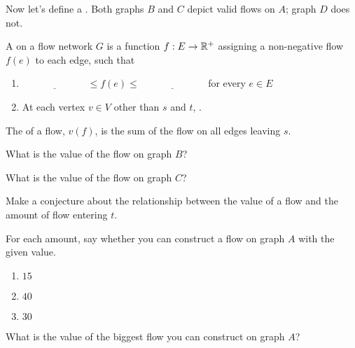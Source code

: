 \documentclass{tufte-handout}
\begin{document}
Now let's define a .  Both graphs $B$ and $C$ depict valid
flows on $A$; graph $D$ does not.

\begin{defn}
  A  on a flow network $G$ is a function $f : E \to \mathbb{R}^+$
  assigning a non-negative flow $f(e)$ to each edge, such that
  \begin{enumerate}
  \item $\underline{\phantom{XXXXXXXX}} \leq f(e) \leq
    \underline{\phantom{XXXXXXXX}}$ for every $e \in E$
  \item At each vertex $v \in V$ other than $s$ and $t$, \blank
    \newline \blank.
  \end{enumerate}
\end{defn}

\begin{defn}
  The  of a flow, $v(f)$, is the sum of the flow on all
  edges leaving $s$.
\end{defn}

\begin{questions}
  \item What is the value of the flow on graph $B$?
  \item What is the value of the flow on graph $C$?
  \item Make a conjecture about the relationship between the value of
    a flow and the amount of flow entering $t$.
  \item For each amount, say whether you can construct a flow on graph
    $A$ with the given value.
    \begin{enumerate}[label=(\alph*)]
    \item $15$ \vspace{1in}
    \item $40$ \vspace{1in}
    \item $30$ \vspace{1in}
    \end{enumerate}
  \item What is the value of the biggest flow you can construct on
    graph $A$?
\end{questions}
\end{document}
